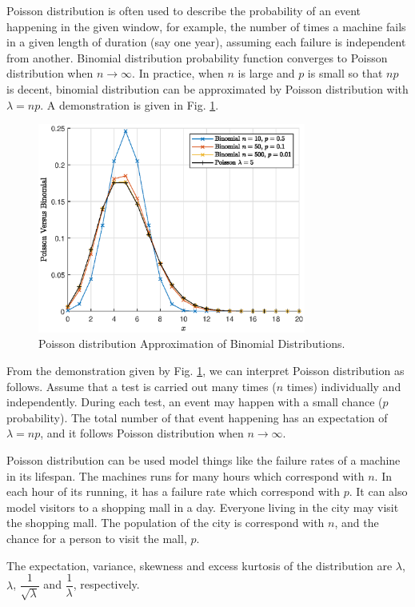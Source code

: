 Poisson distribution is often used to describe the probability of an event happening in the given window, for example, the number of times a machine fails in a given length of duration (say one year), assuming each failure is independent from another. Binomial distribution probability function converges to Poisson distribution when $n\rightarrow\infty$. In practice, when $n$ is large and $p$ is small so that $np$ is decent, binomial distribution can be approximated by Poisson distribution with $\lambda = np$. A demonstration is given in Fig. \ref{fig:poisson_vs_b}.
\begin{figure}
	\centering
	\includegraphics[width=250pt]{chapters/ch-commonly-seen-distributions/figs/poisson_vs_b.eps}
	\caption{Poisson distribution Approximation of Binomial Distributions.} \label{fig:poisson_vs_b}
\end{figure}

From the demonstration given by Fig. \ref{fig:poisson_vs_b}, we can interpret Poisson distribution as follows. Assume that a test is carried out many times ($n$ times) individually and independently. During each test, an event may happen with a small chance ($p$ probability). The total number of that event happening has an expectation of $\lambda = np$, and it follows Poisson distribution when $n\rightarrow\infty$.

Poisson distribution can be used model things like the failure rates of a machine in its lifespan. The machines runs for many hours which correspond with $n$. In each hour of its running, it has a failure rate which correspond with $p$. It can also model visitors to a shopping mall in a day. Everyone living in the city may visit the shopping mall. The population of the city is correspond with $n$, and the chance for a person to visit the mall, $p$.

The expectation, variance, skewness and excess kurtosis of the distribution are $\lambda$, $\lambda$, $\dfrac{1}{\sqrt{\lambda}}$ and $\dfrac{1}{\lambda}$, respectively.

